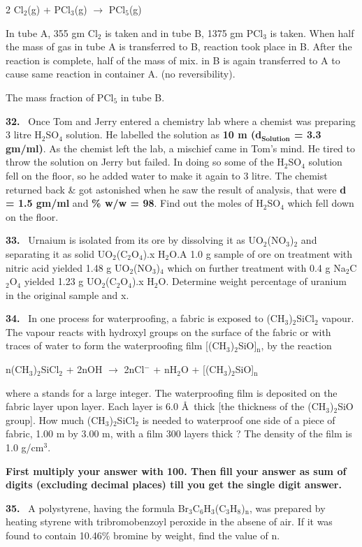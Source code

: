 \documentclass[10pt]{extarticle}
\newcommand{\qn}[1]{\par\smallskip\noindent\textbf{#1.}~}
\begin{document}
\begin{multicols}{2}
Cl$_2$(g) + PCl$_3$(g) $\longrightarrow$ PCl$_5$(g)\par
In tube A, 355 gm Cl$_2$ is taken and in tube B, 1375 gm PCl$_3$ is taken. When half the mass of gas in tube A is transferred to B, reaction took place in B. After the reaction is complete, half of the mass of mix. in B is again transferred to A to cause same reaction in container A. (no reversibility).\par
The mass fraction of PCl$_5$ in tube B.
\qn{32} Once Tom and Jerry entered a chemistry lab where a chemist was preparing 3 litre H$_2$SO$_4$ solution. He labelled the solution as \textbf{10 m (d$_{\textbf{Solution}}$ = 3.3 gm/ml)}. As the chemist left the lab, a mischief came in Tom's mind. He tired to throw the solution on Jerry but failed. In doing so some of the H$_2$SO$_4$ solution fell on the floor, so he added water to make it again to 3 litre. The chemist returned back \& got astonished when he saw the result of analysis, that were \textbf{d = 1.5 gm/ml} and \textbf{\% w/w = 98}. Find out the moles of H$_2$SO$_4$ which fell down on the floor.
\qn{33} Urnaium is isolated from its ore by dissolving it as UO$_2$(NO$_3$)$_2$ and separating it as solid UO$_2$(C$_2$O$_4$).x H$_2$O.A 1.0 g sample of ore on treatment with nitric acid yielded 1.48 g UO$_2$(NO$_3$)$_4$ which on further treatment with 0.4 g Na$_2$C$_2$O$_4$ yielded 1.23 g UO$_2$(C$_2$O$_4$).x H$_2$O. Determine weight percentage of uranium in the original sample and x.
\qn{34} In one process for waterproofing, a fabric is exposed to (CH$_3$)$_2$SiCl$_2$ vapour. The vapour reacts with hydroxyl groups on the surface of the fabric or with traces of water to form the waterproofing film [(CH$_3$)$_2$SiO]$_\mathrm n$, by the reaction\par
n(CH$_3$)$_2$SiCl$_2$ + 2nOH $\longrightarrow$ 2nCl$^-$ + nH$_2$O + [(CH$_3$)$_2$SiO]$_\mathrm n$\par
where a stands for a large integer. The waterproofing film is deposited on the fabric layer upon layer. Each layer is 6.0 \AA\ thick [the thickness of the (CH$_3$)$_2$SiO group]. How much (CH$_3$)$_2$SiCl$_2$ is needed to waterproof one side of a piece of fabric, 1.00 m by 3.00 m, with a film 300 layers thick ? The density of the film is 1.0 g/cm$^3$.\par
\textbf{First multiply your answer with 100. Then fill your answer as sum of digits (excluding decimal places) till you get the single digit answer.}
\qn{35} A polystyrene, having the formula Br$_3$C$_6$H$_3$(C$_3$H$_8$)$_\mathrm n$, was prepared by heating styrene with tribromobenzoyl peroxide in the absene of air. If it was found to contain 10.46\% bromine by weight, find the value of n.

\end{multicols}
\end{document}
